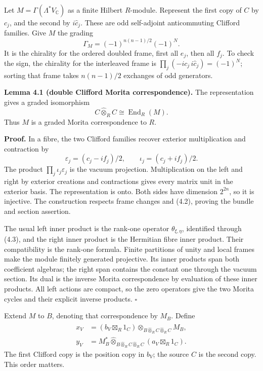 \documentclass[
  11pt,
]{article}
\begin{document}
Let \(M=\Gamma(\Lambda^*V_{\mathbb C})\) as a finite Hilbert
\(R\)-module. Represent the first copy of \(C\) by \(c_j\), and the
second by \(i\widehat c_j\). These are odd self-adjoint anticommuting
Clifford families. Give \(M\) the grading \[
\Gamma_M=(-1)^{n(n-1)/2}(-1)^N.
\tag{4.2}
\] It is the chirality for the ordered doubled frame, first all \(e_j\),
then all \(f_j\). To check the sign, the chirality for the interleaved
frame is \(\prod_j(-i c_j\,i\widehat c_j)=(-1)^N\); sorting that frame
takes \(n(n-1)/2\) exchanges of odd generators.

\textbf{Lemma 4.1 (double Clifford Morita correspondence).} The
representation gives a graded isomorphism \[
C\widehat\otimes_R C\cong\operatorname{End}_R(M).
\tag{4.3}
\] Thus \(M\) is a graded Morita correspondence to \(R\).

\textbf{Proof.} In a fibre, the two Clifford families recover exterior
multiplication and contraction by \[
\varepsilon_j=(c_j-i f_j)/2,\qquad
\iota_j=(c_j+i f_j)/2.
\] The product \(\prod_j\iota_j\varepsilon_j\) is the vacuum projection.
Multiplication on the left and right by exterior creations and
contractions gives every matrix unit in the exterior basis. The
representation is onto. Both sides have dimension \(2^{2n}\), so it is
injective. The construction respects frame changes and (4.2), proving
the bundle and section assertion.

The usual left inner product is the rank-one operator
\(\theta_{\xi,\eta}\), identified through (4.3), and the right inner
product is the Hermitian fibre inner product. Their compatibility is the
rank-one formula. Finite partitions of unity and local frames make the
module finitely generated projective. Its inner products span both
coefficient algebras; the right span contains the constant one through
the vacuum section. Its dual is the inverse Morita correspondence by
evaluation of these inner products. All left actions are compact, so the
zero operators give the two Morita cycles and their explicit inverse
products. \(\square\)

Extend \(M\) to \(B\), denoting that correspondence by \(M_B\). Define
\[
\begin{aligned}
x_V&=(b_V\boxtimes_R1_C)
       \widehat\otimes_{B\widehat\otimes_R C\widehat\otimes_R C}M_B,\\
y_V&=M_B^*
       \widehat\otimes_{B\widehat\otimes_R C\widehat\otimes_R C}
          (a_V\boxtimes_R1_C).
\end{aligned}
\tag{4.4}
\] The first Clifford copy is the position copy in \(b_V\); the source
\(C\) is the second copy. This order matters.
\end{document}
